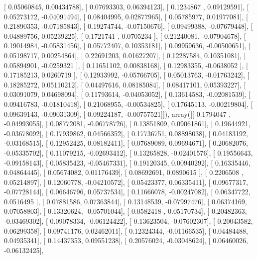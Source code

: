 \documentclass{article}
\begin{document}
       [ 0.05060845,  0.00434788],
       [ 0.07693303,  0.06394123],
       [ 0.1234867 ,  0.09129591],
       [ 0.05273172, -0.04091494],
       [ 0.08404995,  0.02877965],
       [ 0.05785977,  0.01977081],
       [ 0.21890353, -0.07185843],
       [ 0.19274744, -0.07150676],
       [ 0.09499388, -0.07679448],
       [ 0.04889756,  0.05239225],
       [ 0.1721741 ,  0.0705234 ],
       [ 0.21240081, -0.07904678],
       [ 0.19014984, -0.05831456],
       [ 0.05772407,  0.10353181],
       [ 0.09959636, -0.00500651],
       [ 0.05198717,  0.00254864],
       [ 0.22691203,  0.01627207],
       [ 0.12287584,  0.10351081],
       [ 0.05894901, -0.0259321 ],
       [ 0.11651102,  0.00838168],
       [ 0.12983355, -0.0638052 ],
       [ 0.17185213,  0.0260719 ],
       [ 0.12933992, -0.05766705],
       [ 0.05013763, -0.01763242],
       [ 0.18285272,  0.05110212],
       [ 0.04497616,  0.08185084],
       [ 0.08417101,  0.05393227],
       [ 0.03091079,  0.04698094],
       [ 0.11793614, -0.04053052],
       [ 0.13614583, -0.02081539],
       [ 0.09416783, -0.01810418],
       [ 0.21068955, -0.00534825],
       [ 0.17645113, -0.00219804],
       [ 0.09639143, -0.09031309],
       [ 0.09224187, -0.00757521]]), array([[ 0.1794047 , -0.04993055],
       [ 0.08772081, -0.06778726],
       [ 0.13851809,  0.09061861],
       [ 0.19644921, -0.03678092],
       [ 0.17939862,  0.04566352],
       [ 0.17736751,  0.08898038],
       [ 0.04183192, -0.03168515],
       [ 0.12952425,  0.08182411],
       [ 0.07689089,  0.09694671],
       [ 0.20682076, -0.05335702],
       [ 0.11079215, -0.02693412],
       [ 0.13265828, -0.02401576],
       [ 0.19556643, -0.09158143],
       [ 0.05835423, -0.05467331],
       [ 0.19120345,  0.00940292],
       [ 0.16335446,  0.04864445],
       [ 0.05674082,  0.01176439],
       [ 0.08692691,  0.0890615 ],
       [ 0.2206508 ,  0.05214897],
       [ 0.12060778, -0.04210572],
       [ 0.05423377,  0.06335411],
       [ 0.09677317, -0.07728144],
       [ 0.06646796,  0.05737534],
       [ 0.11666078, -0.00247082],
       [ 0.06347722,  0.0516495 ],
       [ 0.07881586,  0.07363844],
       [ 0.13148539, -0.07997476],
       [ 0.06374169,  0.07058803],
       [ 0.13320624, -0.05701044],
       [ 0.0582418 ,  0.05170734],
       [ 0.20482363, -0.03469302],
       [ 0.09078334, -0.06124422],
       [ 0.13623504, -0.07602307],
       [ 0.20043582,  0.06299358],
       [ 0.09741176,  0.02462011],
       [ 0.12324344, -0.01166535],
       [ 0.04484488,  0.04935341],
       [ 0.14437353,  0.09551238],
       [ 0.20576024, -0.03048624],
       [ 0.06460026, -0.06132425],
\end{document}
